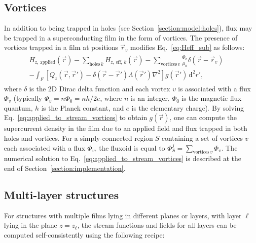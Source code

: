 \documentclass[final,3p,times,twocolumn]{elsarticle}
\newcounter{bla}
\begin{document}
\subsection{Vortices}
\label{section:model:vortices}
In addition to being trapped in holes (see Section~\ref{section:model:holes}), flux may be trapped in a superconducting film in the form of vortices. The presence of vortices trapped in a film at positions $\vec{r}_v$ modifies Eq.~\ref{eq:Heff_sub} as follows:
\begin{align}
\begin{split}
    \label{eq:applied_to_stream_vortices}
    & H_{z,\,\mathrm{applied}}(\vec{r}) - \sum_{\mathrm{holes}\,k} H_{z,\,\mathrm{eff},\,k}(\vec{r}) - \sum_{\mathrm{vortices}\,v}\frac{\Phi_v}{\mu_0}\delta(\vec{r}-\vec{r}_v)
    = \\
    &-\int_F\left[
        Q_z(\vec{r},\vec{r}')-\delta(\vec{r}-\vec{r}')\Lambda(\vec{r}')\nabla^2\right
    ]g(\vec{r}')\,\mathrm{d}^2r',
\end{split}
\end{align}
where $\delta$ is the 2D Dirac delta function and each vortex $v$ is associated with a flux $\Phi_v$ (typically $\Phi_v=n\Phi_0=nh/2e$, where $n$ is an integer, $\Phi_0$ is the magnetic flux quantum, $h$ is the Planck constant, and $e$ is the elementary charge). By solving Eq.~\ref{eq:applied_to_stream_vortices} to obtain $g(\vec{r})$, one can compute the supercurrent density in the film due to an applied field and flux trapped in both holes and vortices. For a simply-connected region $S$ containing a set of vortices $v$ each associated with a flux $\Phi_v$, the fluxoid is equal to $\Phi^f_S=\sum_{\mathrm{vortices}\,v}\Phi_v$. The numerical solution to Eq.~\ref{eq:applied_to_stream_vortices} is described at the end of Section~\ref{section:implementation}.

\subsection{Multi-layer structures}
\label{section:model:multilayer}

For structures with multiple films lying in different planes or layers, with layer $\ell$ lying in the plane $z=z_\ell$,
the stream functions and fields for all layers can be computed self-consistently using the following recipe:
\end{document}
